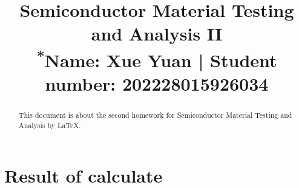 \documentclass[homework]{IEEEtran}
\begin{document}
\title{Semiconductor Material Testing and Analysis II\\
{\footnotesize \textsuperscript{*}Name: Xue Yuan  | Student number: 202228015926034}
}

\author{}
\maketitle

\begin{abstract}
This document is about the second homework for Semiconductor Material Testing and Analysis by \LaTeX.
\end{abstract}

\section{Result of calculate}
\end{document}
